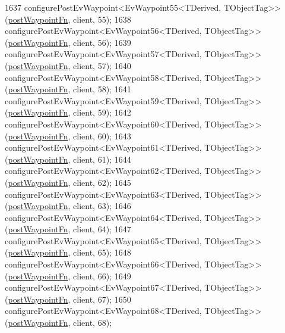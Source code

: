 \begin{DoxyCode}
1637     configurePostEvWaypoint<EvWaypoint55<TDerived, TObjectTag>>(\hyperlink{classcl__move__base__z_1_1WaypointEventDispatcher_a964a57fcce5d48ec60243230722d8dd7}{postWaypointFn}, client, 55);
1638     configurePostEvWaypoint<EvWaypoint56<TDerived, TObjectTag>>(\hyperlink{classcl__move__base__z_1_1WaypointEventDispatcher_a964a57fcce5d48ec60243230722d8dd7}{postWaypointFn}, client, 56);
1639     configurePostEvWaypoint<EvWaypoint57<TDerived, TObjectTag>>(\hyperlink{classcl__move__base__z_1_1WaypointEventDispatcher_a964a57fcce5d48ec60243230722d8dd7}{postWaypointFn}, client, 57);
1640     configurePostEvWaypoint<EvWaypoint58<TDerived, TObjectTag>>(\hyperlink{classcl__move__base__z_1_1WaypointEventDispatcher_a964a57fcce5d48ec60243230722d8dd7}{postWaypointFn}, client, 58);
1641     configurePostEvWaypoint<EvWaypoint59<TDerived, TObjectTag>>(\hyperlink{classcl__move__base__z_1_1WaypointEventDispatcher_a964a57fcce5d48ec60243230722d8dd7}{postWaypointFn}, client, 59);
1642     configurePostEvWaypoint<EvWaypoint60<TDerived, TObjectTag>>(\hyperlink{classcl__move__base__z_1_1WaypointEventDispatcher_a964a57fcce5d48ec60243230722d8dd7}{postWaypointFn}, client, 60);
1643     configurePostEvWaypoint<EvWaypoint61<TDerived, TObjectTag>>(\hyperlink{classcl__move__base__z_1_1WaypointEventDispatcher_a964a57fcce5d48ec60243230722d8dd7}{postWaypointFn}, client, 61);
1644     configurePostEvWaypoint<EvWaypoint62<TDerived, TObjectTag>>(\hyperlink{classcl__move__base__z_1_1WaypointEventDispatcher_a964a57fcce5d48ec60243230722d8dd7}{postWaypointFn}, client, 62);
1645     configurePostEvWaypoint<EvWaypoint63<TDerived, TObjectTag>>(\hyperlink{classcl__move__base__z_1_1WaypointEventDispatcher_a964a57fcce5d48ec60243230722d8dd7}{postWaypointFn}, client, 63);
1646     configurePostEvWaypoint<EvWaypoint64<TDerived, TObjectTag>>(\hyperlink{classcl__move__base__z_1_1WaypointEventDispatcher_a964a57fcce5d48ec60243230722d8dd7}{postWaypointFn}, client, 64);
1647     configurePostEvWaypoint<EvWaypoint65<TDerived, TObjectTag>>(\hyperlink{classcl__move__base__z_1_1WaypointEventDispatcher_a964a57fcce5d48ec60243230722d8dd7}{postWaypointFn}, client, 65);
1648     configurePostEvWaypoint<EvWaypoint66<TDerived, TObjectTag>>(\hyperlink{classcl__move__base__z_1_1WaypointEventDispatcher_a964a57fcce5d48ec60243230722d8dd7}{postWaypointFn}, client, 66);
1649     configurePostEvWaypoint<EvWaypoint67<TDerived, TObjectTag>>(\hyperlink{classcl__move__base__z_1_1WaypointEventDispatcher_a964a57fcce5d48ec60243230722d8dd7}{postWaypointFn}, client, 67);
1650     configurePostEvWaypoint<EvWaypoint68<TDerived, TObjectTag>>(\hyperlink{classcl__move__base__z_1_1WaypointEventDispatcher_a964a57fcce5d48ec60243230722d8dd7}{postWaypointFn}, client, 68);

\end{DoxyCode}
